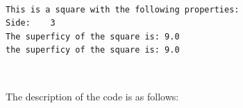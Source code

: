 \documentclass[11pt]{article}
\begin{document}
    \begin{center}
    \end{center}
    { \hspace*{\fill} \\}
    
    \begin{Verbatim}[commandchars=\\\{\}]
This is a square with the following properties:
Side:    3
The superficy of the square is: 9.0
the superficy of the square is: 9.0
    \end{Verbatim}

    \begin{center}
    \end{center}
    { \hspace*{\fill} \\}
    
    The description of the code is as follows:
\end{document}
